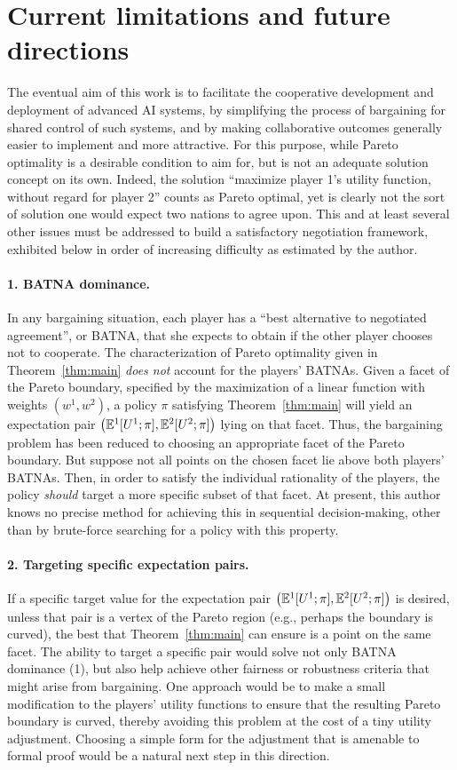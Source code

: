 \documentclass{article}  %
\newcommand{\epair}{\left(\EE^1[U^1;\pi],\EE^2[U^2;\pi]\right)}
\newcommand{\thm}[1]{Theorem~\ref{thm:#1}}
\begin{document}
\section{Current limitations and future directions}

The eventual aim of this work is to facilitate the cooperative development and deployment of advanced AI systems, by simplifying the process of bargaining for shared control of such systems, and by making collaborative outcomes generally easier to implement and more attractive.  For this purpose, while Pareto optimality is a desirable condition to aim for, but is not an adequate solution concept on its own.  Indeed, the solution ``maximize player 1's utility function, without regard for player 2'' counts as Pareto optimal, yet is clearly not the sort of solution one would expect two nations to agree upon.  This and at least several other issues must be addressed to build a satisfactory negotiation framework, exhibited below in order of increasing difficulty as estimated by the author.

\paragraph{1. BATNA dominance.}  In any bargaining situation, each player has a ``best alternative to negotiated agreement'', or BATNA, that she expects to obtain if the other player chooses not to cooperate.  The characterization of Pareto optimality given in \thm{main} {\em does not} account for the players' BATNAs.  Given a facet of the Pareto boundary, specified by the maximization of a linear function with weights $(w^1,w^2)$, a policy $\pi$ satisfying \thm{main} will yield an expectation pair $\epair$ lying on that facet.  Thus, the bargaining problem has been reduced to choosing an appropriate facet of the Pareto boundary.  But suppose not all points on the chosen facet lie above both players' BATNAs.  Then, in order to satisfy the individual rationality of the players, the policy {\em should} target a more specific subset of that facet.  At present, this author knows no precise method for achieving this in sequential decision-making, other than by brute-force searching for a policy with this property.

\paragraph{2. Targeting specific expectation pairs.}  If a specific target value for the expectation pair $\epair$ is desired, unless that pair is a vertex of the Pareto region (e.g., perhaps the boundary is curved), the best that \thm{main} can ensure is a point on the same facet.  The ability to target a specific pair would solve not only BATNA dominance (1), but also help achieve other fairness or robustness criteria that might arise from bargaining.  One approach would be to make a small modification to the players' utility functions to ensure that the resulting Pareto boundary is curved, thereby avoiding this problem at the cost of a tiny utility adjustment.  Choosing a simple form for the adjustment that is amenable to formal proof would be a natural next step in this direction.
\end{document}
